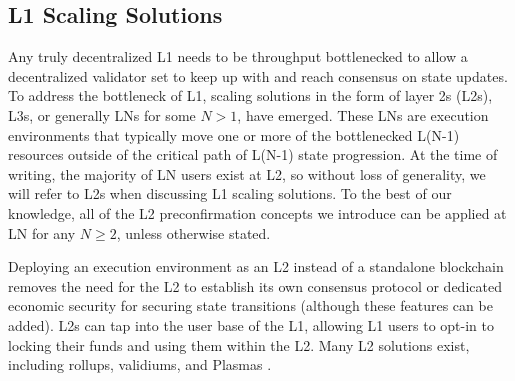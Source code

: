 \documentclass[a4paper]{article}
\theoremstyle{boldstyle}
\begin{document}

\subsection{L1 Scaling Solutions}\label{sec:intro_L2}

Any truly decentralized L1 needs to be throughput bottlenecked to allow a decentralized validator set to keep up with and reach consensus on state updates. To address the bottleneck of L1, scaling solutions in the form of layer 2s (L2s), L3s, or generally LNs for some $N>1$, have emerged. These LNs are execution environments that typically move one or more of the bottlenecked L(N-1) resources outside of the critical path of L(N-1) state progression. At the time of writing, the majority of LN users exist at L2, so without loss of generality, we will refer to L2s when discussing L1 scaling solutions. To the best of our knowledge, all of the L2 preconfirmation concepts we introduce can be applied at LN for any $N\geq 2$, unless otherwise stated.

Deploying an execution environment as an L2 instead of a standalone blockchain removes the need for the L2 to establish its own consensus protocol or dedicated economic security for securing state transitions (although these features can be added). L2s can tap into the user base of the L1, allowing L1 users to opt-in to locking their funds and using them within the L2. Many L2 solutions exist, including rollups, validiums, and Plasmas \cite{L2_versus_execution_sharding}.
\end{document}
